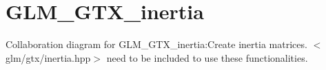 \hypertarget{group__gtx__inertia}{
\section{GLM\_\-GTX\_\-inertia}
\label{group__gtx__inertia}
}


Collaboration diagram for GLM\_\-GTX\_\-inertia:Create inertia matrices.  
$<$glm/gtx/inertia.hpp$>$ need to be included to use these functionalities. 